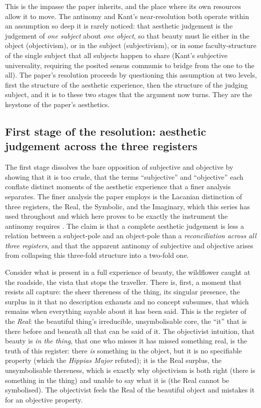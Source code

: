 This is the impasse the paper inherits, and the place where its own resources allow it to move. The antinomy and Kant's near-resolution both operate within an assumption so deep it is rarely noticed: that aesthetic judgement is the judgement of \emph{one subject} about \emph{one object}, so that beauty must lie either in the object (objectivism), or in the subject (subjectivism), or in some faculty-structure of the single subject that all subjects happen to share (Kant's subjective universality, requiring the posited sensus communis to bridge from the one to the all). The paper's resolution proceeds by questioning this assumption at two levels, first the structure of the aesthetic experience, then the structure of the judging subject, and it is to these two stages that the argument now turns. They are the keystone of the paper's aesthetics.

\subsection{First stage of the resolution: aesthetic judgement across the three registers}
\label{p21:sub:ap-threeregisters}

The first stage dissolves the bare opposition of subjective and objective by showing that it is too crude, that the terms ``subjective'' and ``objective'' each conflate distinct moments of the aesthetic experience that a finer analysis separates. The finer analysis the paper employs is the Lacanian distinction of three registers, the Real, the Symbolic, and the Imaginary, which this series has used throughout and which here proves to be exactly the instrument the antinomy requires \parencite{lacan2006b}. The claim is that a complete aesthetic judgement is less a relation between a subject-pole and an object-pole than a \emph{reconciliation across all three registers}, and that the apparent antinomy of subjective and objective arises from collapsing this three-fold structure into a two-fold one.

Consider what is present in a full experience of beauty, the wildflower caught at the roadside, the vista that stops the traveller. There is, first, a moment that resists all capture: the sheer thereness of the thing, its singular presence, the surplus in it that no description exhausts and no concept subsumes, that which remains when everything sayable about it has been said. This is the register of the \emph{Real}: the beautiful thing's irreducible, unsymbolisable core, the ``it'' that is there before and beneath all that can be said of it. The objectivist intuition, that beauty is \emph{in the thing}, that one who misses it has missed something real, is the truth of this register: there \emph{is} something in the object, but it is no specifiable property (which the \emph{Hippias Major} refuted); it is the Real surplus, the unsymbolisable thereness, which is exactly why objectivism is both right (there is something in the thing) and unable to say what it is (the Real cannot be symbolised). The objectivist feels the Real of the beautiful object and mistakes it for an objective property.

